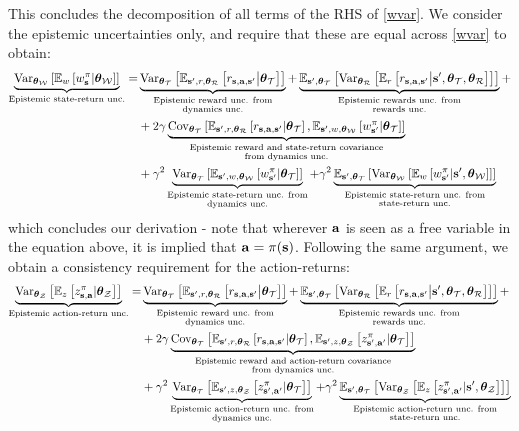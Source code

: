 \documentclass{article}
\begin{document}
This concludes the decomposition of all terms of the RHS of \cref{wvar}. We consider the epistemic uncertainties only, and require that these are equal across \cref{wvar} to obtain:
\begin{align}
\underbrace{\Var_{\thetamcw} \sqb{\E_w\sqb{\wb | \thetamcw}}}_{\text{Epistemic state-return unc.}} =& \underbrace{\Var_{\thetamct} \sqb{ \E_{\ns, r, \thetamcr} \sqb{\rsanb \big| \thetamct}}}_{\substack{\text{Epistemic reward unc. from} \\ \text{dynamics unc.}}} + \underbrace{\E_{\ns, \thetamct}\sqb{ \Var_{\thetamcr} \sqb{ \E_r \sqb{\rsanb \big| \ns, \thetamct, \thetamcr}}}}_{\substack{\text{Epistemic rewards unc. from} \\ \text{rewards unc.}}} \nonumber + \\
& + 2 \gamma \underbrace{\Cov_{\thetamct}\sqb{\E_{\ns, r, \thetamcr}\sqb{\rsanb | \thetamct}, \E_{\ns, w, \thetamcw}\sqb{\wnb | \thetamct}}}_{\substack{\text{Epistemic reward and state-return covariance} \\ \text{from dynamics unc.}}} \nonumber\\
& + \gamma^2 \underbrace{\Var_{\thetamct} \sqb{\E_{\ns, w, \thetamcw} \sqb{\wnb | \thetamct}}}_{\substack{\text{Epistemic state-return unc. from} \\ \text{dynamics unc.}}}  + \gamma^2 \underbrace{\E_{\ns, \thetamct}\sqb{\Var_{\thetamcw} \sqb{ \E_w \sqb{\wnb | \ns, \thetamcw}}}}_{\substack{\text{Epistemic state-return unc. from} \\ \text{state-return unc.}}} \label{wepeq}
\end{align}
which concludes our derivation - note that wherever $\ac$ is seen as a free variable in the equation above, it is implied that $\ac = \pi(\s)$. Following the same argument, we obtain a consistency requirement for the action-returns:
\begin{align}
\underbrace{\Var_{\thetamcz} \sqb{\E_z\sqb{\zb | \thetamcz}}}_{\text{Epistemic action-return unc.}} =& \underbrace{\Var_{\thetamct} \sqb{ \E_{\ns, r, \thetamcr} \sqb{\rsanb \big| \thetamct}}}_{\substack{\text{Epistemic reward unc. from} \nonumber \\ \text{dynamics unc.}}} + \underbrace{\E_{\ns, \thetamct}\sqb{ \Var_{\thetamcr} \sqb{ \E_r \sqb{\rsanb \big| \ns, \thetamct, \thetamcr}}}}_{\substack{\text{Epistemic rewards unc. from} \\ \text{rewards unc.}}} + \\
& + 2 \gamma \underbrace{\Cov_{\thetamct}\sqb{\E_{\ns, r, \thetamcr}\sqb{\rsanb | \thetamct}, \E_{\ns, z, \thetamcz}\sqb{\znb | \thetamct}}}_{\substack{\text{Epistemic reward and action-return covariance} \\ \text{from dynamics unc.}}} \nonumber \\
& + \gamma^2 \underbrace{\Var_{\thetamct} \sqb{\E_{\ns, z, \thetamcz} \sqb{\znb | \thetamct}}}_{\substack{\text{Epistemic action-return unc. from} \\ \text{dynamics unc.}}}  +  \gamma^2 \underbrace{\E_{\ns, \thetamct}\sqb{\Var_{\thetamcz} \sqb{ \E_z \sqb{\znb | \ns, \thetamcz}}}}_{\substack{\text{Epistemic action-return unc. from} \\ \text{state-return unc.}}} \label{zepeq}
\end{align}
\end{document}
